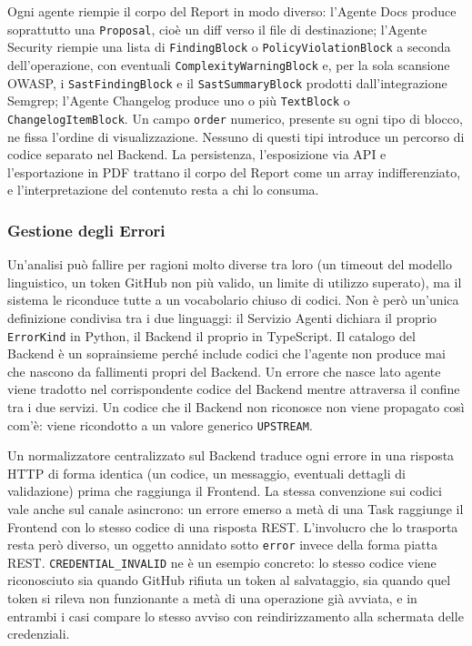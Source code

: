 \documentclass[12pt, a4paper]{article}
\begin{document}
Ogni agente riempie il corpo del Report in modo diverso: l'Agente Docs produce soprattutto una \texttt{Proposal}, cioè un diff verso il file di destinazione; l'Agente Security riempie una lista di \texttt{FindingBlock} o \texttt{PolicyViolationBlock} a seconda dell'operazione, con eventuali \texttt{ComplexityWarningBlock} e, per la sola scansione OWASP, i \texttt{SastFindingBlock} e il \texttt{SastSummaryBlock} prodotti dall'integrazione Semgrep; l'Agente Changelog produce uno o più \texttt{TextBlock} o \texttt{ChangelogItemBlock}. Un campo \texttt{order} numerico, presente su ogni tipo di blocco, ne fissa l'ordine di visualizzazione. Nessuno di questi tipi introduce un percorso di codice separato nel Backend. La persistenza, l'esposizione via API e l'esportazione in PDF trattano il corpo del Report come un array indifferenziato, e l'interpretazione del contenuto resta a chi lo consuma.
\subsubsection{Gestione degli Errori}

Un'analisi può fallire per ragioni molto diverse tra loro (un timeout del modello linguistico, un token GitHub non più valido, un limite di utilizzo superato), ma il sistema le riconduce tutte a un vocabolario chiuso di codici. Non è però un'unica definizione condivisa tra i due linguaggi: il Servizio Agenti dichiara il proprio \texttt{ErrorKind} in Python, il Backend il proprio in TypeScript. Il catalogo del Backend è un soprainsieme perché include codici che l'agente non produce mai che nascono da fallimenti propri del Backend. Un errore che nasce lato agente viene tradotto nel corrispondente codice del Backend mentre attraversa il confine tra i due servizi. Un codice che il Backend non riconosce non viene propagato così com'è: viene ricondotto a un valore generico \texttt{UPSTREAM}.

Un normalizzatore centralizzato sul Backend traduce ogni errore in una risposta HTTP di forma identica (un codice, un messaggio, eventuali dettagli di validazione) prima che raggiunga il Frontend. La stessa convenzione sui codici vale anche sul canale asincrono: un errore emerso a metà di una Task raggiunge il Frontend con lo stesso codice di una risposta REST. L'involucro che lo trasporta resta però diverso, un oggetto annidato sotto \texttt{error} invece della forma piatta REST. \texttt{CREDENTIAL\_INVALID} ne è un esempio concreto: lo stesso codice viene riconosciuto sia quando GitHub rifiuta un token al salvataggio, sia quando quel token si rileva non funzionante a metà di una operazione già avviata, e in entrambi i casi compare lo stesso avviso con reindirizzamento alla schermata delle credenziali.
\end{document}

